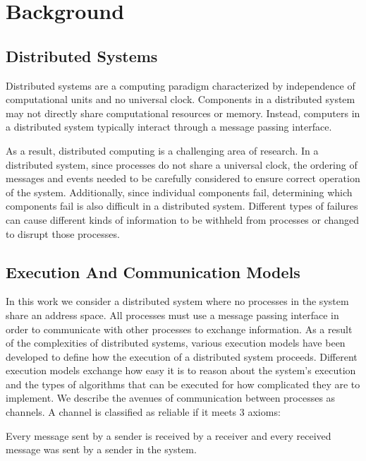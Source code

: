 \chapter{Background}

\section{Distributed Systems}

Distributed systems are a computing paradigm characterized by independence of computational units and no universal clock.
Components in a distributed system may not directly share computational resources or memory.
Instead, computers in a distributed system typically interact through a message passing interface.

As a result, distributed computing is a challenging area of research.
In a distributed system, since processes do not share a universal clock, the ordering of messages and events needed to be carefully considered to ensure correct operation of the system.
Additionally, since individual components fail, determining which components fail is also difficult in a distributed system.
Different types of failures can cause different kinds of information to be withheld from processes or changed to disrupt those processes.

\section{Execution And Communication Models}

In this work we consider a distributed system where no processes in the system share an address space.
All processes must use a message passing interface in order to communicate with other processes to exchange information.
As a result of the complexities of distributed systems, various execution models have been developed to define how the execution of a distributed system proceeds.
Different execution models exchange how easy it is to reason about the system's execution and the types of algorithms that can be executed for how complicated they are to implement.
We describe the avenues of communication between processes as channels.
A channel is classified as reliable if it meets 3 axioms:

\begin{axm}
    \label{axm:reliable-channel-sender}
    Every message sent by a sender is received by a receiver and every received message was sent by a sender in the system. \cite{DISTRIBUTED}
\end{axm}

